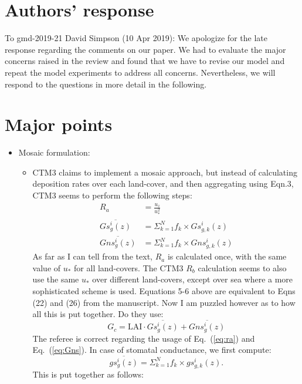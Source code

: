 \documentclass{scrartcl}
\begin{document}
\section*{Authors' response}
To gmd-2019-21 David Simpson (10 Apr 2019):
We apologize for the late response regarding the comments on our paper. We had to evaluate the major concerns raised in the review and found that we have to revise our model and repeat the model experiments to address all concerns. Nevertheless, we will respond to the questions in more detail in the following.

\section{Major points}
\begin{itemize}
\item {\color{blue} Mosaic formulation:}
  \begin{itemize}
  \item {\color{blue} CTM3 claims to implement a mosaic approach, but instead of calculating deposition
rates over each land-cover, and then aggregating using Eqn.3, CTM3 seems to perform the following steps:
\begin{align}
  \label{eq:ra}
  R_a &= \frac{u_z}{u^2_*}\\
  \label{eq:Gsto}
  \overline{Gs^i_g(z)} &= \Sigma^N_{k=1} f_k \times Gs^i_{g,k}(z)\\
  \label{eq:Gns}
  \overline{Gns^i_g(z)} &= \Sigma^N_{k=1} f_k \times Gns^i_{g,k}(z)
\end{align}
As far as I can tell from the text, $R_a$ is calculated once, with the same value of $u_*$ for all land-covers. The CTM3 $R_b$ calculation seems to also use the same $u_*$ over different land-covers, except over sea where a more sophisticated scheme is used. Equations 5-6 above are equivalent to Eqns (22) and (26) from the manuscript. Now I am puzzled however as to how all this is put together. Do they use:
\begin{equation}
  G_c = \mathrm{LAI} \cdot \overline{Gs^i_g(z)} + \overline{Gns^i_g(z)}
\end{equation}
  }
    The referee is correct regarding the usage of Eq.~(\ref{eq:ra}) and Eq.~(\ref{eq:Gns}). In case of stomatal conductance, we first compute:
    \begin{equation}
       \overline{gs^i_g(z)} = \Sigma^N_{k=1} f_k \times gs^i_{g,k}(z).
    \end{equation}
    This is put together as follows:
    \begin{equation}

\end{equation}
\end{itemize}
\end{itemize}
\end{document}
